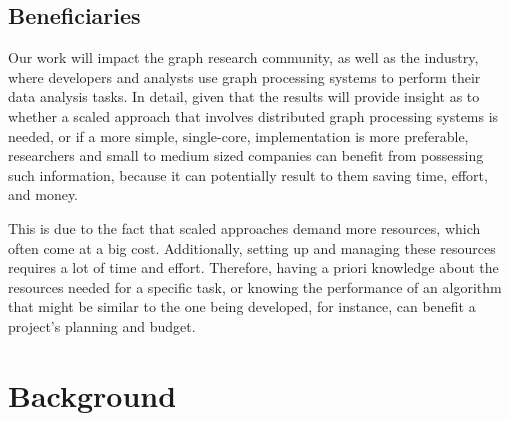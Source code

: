 \documentclass[a4paper,11pt]{article}
\begin{document}

\subsection{Beneficiaries}

\par Our work will impact the graph research community, as well as the industry, where developers and analysts use graph processing systems to perform their data analysis tasks. In detail, given that the results will provide insight as to whether a scaled approach that involves distributed graph processing systems is needed, or if a more simple, single-core, implementation is more preferable, researchers and small to medium sized companies can benefit from possessing such information, because it can potentially result to them saving time, effort, and money. 

\par This is due to the fact that scaled approaches demand more resources, which often come at a big cost. Additionally, setting up and managing these resources requires a lot of time and effort. Therefore, having a priori knowledge about the resources needed for a specific task, or knowing the performance of an algorithm that might be similar to the one being developed, for instance, can benefit a project's planning and budget.





\section{Background} \label{background}

\end{document}
